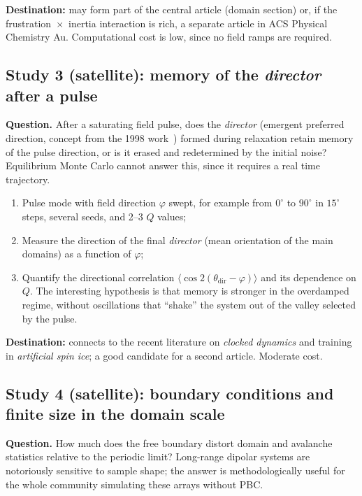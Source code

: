 \documentclass[11pt,a4paper]{article}
\begin{document}
\textbf{Destination:} may form part of the central article (domain section) or, if the frustration~$\times$~inertia interaction is rich, a separate article in ACS Physical Chemistry Au. Computational cost is low, since no field ramps are required.

\subsection{Study 3 (satellite): memory of the \emph{director} after a pulse}

\textbf{Question.} After a saturating field pulse, does the \emph{director} (emergent preferred direction, concept from the 1998 work~\cite{prb1998}) formed during relaxation retain memory of the pulse direction, or is it erased and redetermined by the initial noise? Equilibrium Monte Carlo cannot answer this, since it requires a real time trajectory.

\begin{enumerate}
\item Pulse mode with field direction $\varphi$ swept, for example from $0^\circ$ to $90^\circ$ in $15^\circ$ steps, several seeds, and 2--3 $Q$ values;
\item Measure the direction of the final \emph{director} (mean orientation of the main domains) as a function of $\varphi$;
\item Quantify the directional correlation $\langle \cos 2(\theta_{\mathrm{dir}} - \varphi) \rangle$ and its dependence on $Q$. The interesting hypothesis is that memory is stronger in the overdamped regime, without oscillations that ``shake'' the system out of the valley selected by the pulse.
\end{enumerate}

\textbf{Destination:} connects to the recent literature on \emph{clocked dynamics} and training in \emph{artificial spin ice}; a good candidate for a second article. Moderate cost.

\subsection{Study 4 (satellite): boundary conditions and finite size in the domain scale}

\textbf{Question.} How much does the free boundary distort domain and avalanche statistics relative to the periodic limit? Long-range dipolar systems are notoriously sensitive to sample shape; the answer is methodologically useful for the whole community simulating these arrays without PBC.
\end{document}
